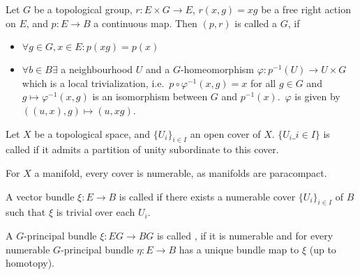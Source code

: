 \documentclass[a4paper,11pt]{article}
\begin{document}

\begin{definition}
    Let \(G\) be a topological group, \(r:E\times G\to E\), \(r(x,g)=xg\) be a free right action on \(E\), and \(p:E\to B\) a continuous map. Then \((p,r)\) is called a \(G\), if 
    \begin{itemize}
        \item \(\forall g\in G, x\in E: p(xg)=p(x)\)
        \item \(\forall b\in B\exists\) a neighbourhood \(U\) and a \(G\)-homeomorphism \(\varphi:p^{-1}(U)\to U\times G\) which is a local trivialization, i.e.\ \(p\circ\varphi^{-1}(x,g)=x\) for all \(g\in G\) and \(g\mapsto\varphi^{-1}(x,g)\) is an isomorphism between \(G\) and \(p^{-1}(x)\).\ \(\varphi\) is given by \(((u,x),g)\mapsto (u,xg)\).
    \end{itemize}
\end{definition}

\begin{definition}
    Let \(X\) be a topological space, and \(\{U_i \}_{i\in I}\) an open cover of \(X\). \(\{U_i\_{i\in I}\}\) is called  if it admits a partition of unity subordinate to this cover.
\end{definition}

\begin{remark}
    For \(X\) a manifold, every cover is numerable, as manifolds are paracompact.
\end{remark}

\begin{definition}
    A vector bundle \(\xi:E\to B\) is called  if there exists a numerable cover \(\{U_i \}_{i\in I}\) of \(B\) such that \(\xi\) is trivial over each \(U_i\).
\end{definition}

\begin{definition}
    A \(G\)-principal bundle \(\xi:EG\to BG\) is called , if it is numerable and for every numerable \(G\)-principal bundle \(\eta:E\to B\) has a unique bundle map to \(\xi\) (up to homotopy).
\end{definition}
\end{document}
